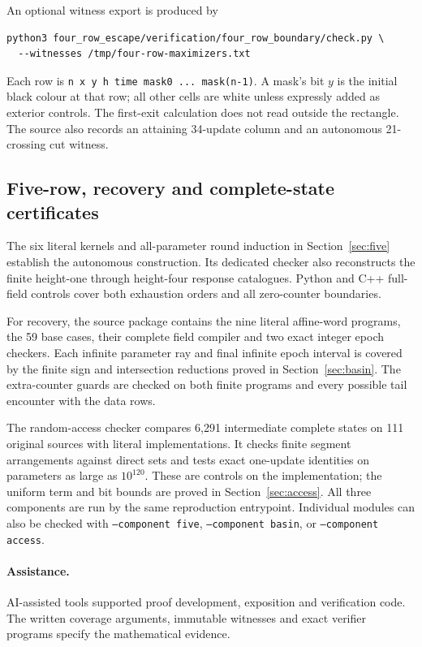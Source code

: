 \documentclass[11pt]{article}
\theoremstyle{definition}\newtheorem{definition}[theorem]{Definition}
\begin{document}
An optional witness export is produced by
\begin{Verbatim}[fontsize=\small]
python3 four_row_escape/verification/four_row_boundary/check.py \
  --witnesses /tmp/four-row-maximizers.txt
\end{Verbatim}
Each row is \texttt{n x y h time mask0 ... mask(n-1)}. A mask's bit $y$ is the
initial black colour at that row; all other cells are white unless expressly
added as exterior controls. The first-exit calculation does not read outside
the rectangle. The source also records an attaining 34-update column and an
autonomous 21-crossing cut witness.

\subsection{Five-row, recovery and complete-state certificates}
The six literal kernels and all-parameter round induction in
Section~\ref{sec:five} establish the autonomous construction. Its dedicated
checker also reconstructs the finite height-one through height-four response
catalogues. Python and C++ full-field controls cover both exhaustion orders
and all zero-counter boundaries.

For recovery, the source package contains the nine literal affine-word programs,
the 59 base cases, their complete field compiler and two exact integer epoch
checkers. Each infinite parameter ray and final infinite epoch interval is
covered by the finite sign and intersection reductions proved in
Section~\ref{sec:basin}. The extra-counter guards are checked on both finite
programs and every possible tail encounter with the data rows.

The random-access checker compares 6,291 intermediate complete states on
111 original sources with literal implementations. It checks finite segment
arrangements against direct sets and tests exact one-update identities on
parameters as large as $10^{120}$. These are controls on the implementation;
the uniform term and bit bounds are proved in Section~\ref{sec:access}.
All three components are run by the same reproduction entrypoint. Individual
modules can also be checked with \texttt{--component five},
\texttt{--component basin}, or \texttt{--component access}.

\paragraph{Assistance.} AI-assisted tools supported proof development,
exposition and verification code. The written coverage arguments, immutable
witnesses and exact verifier programs specify the mathematical evidence.
\end{document}
